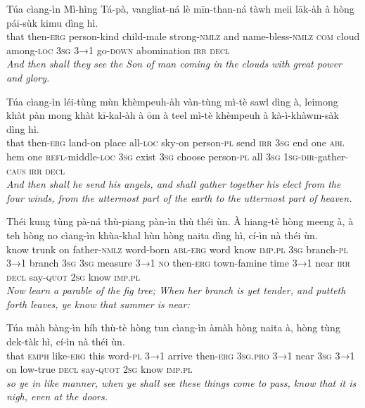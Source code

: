 \documentclass[11pt,a4paper]{article}
\begin{document}
\begin{exe}
\gll Túa cìang-ìn Mì-hìng Tá-pà, vangliat-ná lè mīn-than-ná tàwh meii lāk-àh à hòng pái-sùk kimu dìng hì. \\
     that then-\textsc{erg} person-kind child-male strong-\textsc{nmlz} and name-bless-\textsc{nmlz} \textsc{com} cloud among-\textsc{loc} \textsc{3sg} \textsc{3→1} go-\textsc{down} abomination \textsc{irr} \textsc{decl} \\
\glt \textcolor{kjvcolor}{\textit{And then shall they see the Son of man coming in the clouds with great power and glory.}}

\gll Túa cìang-ìn léi-tùng mùn khèmpeuh-àh vàn-tùng mì-tè sawl dìng à, leimong khàt pàn mong khàt kī-kal-àh à ōm à teel mì-tè khèmpeuh à kà-ì-khàwm-sàk dìng hì. \\
     that then-\textsc{erg} land-on place all-\textsc{loc} sky-on person-\textsc{pl} send \textsc{irr} \textsc{3sg} end one \textsc{abl} hem one \textsc{refl}-middle-\textsc{loc} \textsc{3sg} exist \textsc{3sg} choose person-\textsc{pl} all \textsc{3sg} \textsc{1sg}-\textsc{dir}-gather-\textsc{caus} \textsc{irr} \textsc{decl} \\
\glt \textcolor{kjvcolor}{\textit{And then shall he send his angels, and shall gather together his elect from the four winds, from the uttermost part of the earth to the uttermost part of heaven.}}

\gll Théi kung tùng pà-ná thù-piang pàn-ìn thù théi ùn. À hiang-tè hòng meeng à, à teh hòng no cìang-ìn khùa-khal hùn hòng naita dìng hì, cí-ìn nà théi ùn. \\
     know trunk on father-\textsc{nmlz} word-born \textsc{abl}-\textsc{erg} word know \textsc{imp}.\textsc{pl} \textsc{3sg} branch-\textsc{pl} \textsc{3→1} branch \textsc{3sg} \textsc{3sg} measure \textsc{3→1} \textsc{no} then-\textsc{erg} town-famine time \textsc{3→1} near \textsc{irr} \textsc{decl} say-\textsc{quot} \textsc{2sg} know \textsc{imp}.\textsc{pl} \\
\glt \textcolor{kjvcolor}{\textit{Now learn a parable of the fig tree; When her branch is yet tender, and putteth forth leaves, ye know that summer is near:}}

\gll Túa màh bàng-ìn híh thù-tè hòng tun cìang-ìn àmàh hòng naita à, hòng tùng dek-tàk hì, cí-ìn nà théi ùn. \\
     that \textsc{emph} like-\textsc{erg} this word-\textsc{pl} \textsc{3→1} arrive then-\textsc{erg} \textsc{3sg}.\textsc{pro} \textsc{3→1} near \textsc{3sg} \textsc{3→1} on low-true \textsc{decl} say-\textsc{quot} \textsc{2sg} know \textsc{imp}.\textsc{pl} \\
\glt \textcolor{kjvcolor}{\textit{so ye in like manner, when ye shall see these things come to pass, know that it is nigh, even at the doors.}}


\end{exe}
\end{document}
